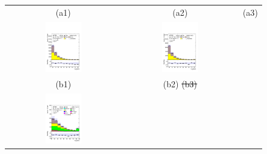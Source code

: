 \documentclass[PAPER, coverpage, atlasdraft=true, texlive=2016, UKenglish]{\ATLASLATEXPATH atlasdoc}
\providecommand{\DIFdel}[1]{{\protect\color{red}\sout{#1}}}                      %
\providecommand{\DIFdelFL}[1]{\DIFdel{#1}} %
\providecommand{\DIFaddbeginFL}{} %
\providecommand{\DIFaddendFL}{} %
\providecommand{\DIFdelbeginFL}{} %
\providecommand{\DIFdelendFL}{} %
\begin{document}
\begin{figure}[H]
\begin{tabular}{@{}ccc@{}}
(a1) & (a2) & (a3) \\
\includegraphics[page=1,width=0.33\textwidth]{figures/new_pt/reg1l1tau1b2j_os.pdf}&
\includegraphics[page=1,width=0.33\textwidth]{figures/new_pt/reg1l1tau1b3j_os.pdf}\DIFdelbeginFL %
\DIFdelendFL \\
(b1) & (b2) \DIFdelbeginFL %
\DIFdelFL{(b3) }\DIFdelendFL \\
\DIFdelbeginFL %
\DIFdelendFL \DIFaddbeginFL \includegraphics[page=1,width=0.33\textwidth]{figures/new_pt/reg2mtau1b2jos_vetobtagwp70_highmet.pdf}\DIFaddendFL &

\end{tabular}
\end{figure}
\end{document}
